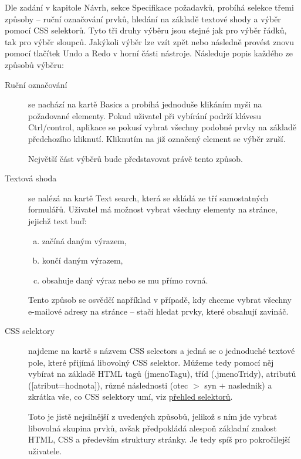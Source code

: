 \documentclass[thesis=B,czech]{FITthesis2}[2012/06/26]
\begin{document}
	Dle zadání v kapitole Návrh, sekce Specifikace požadavků, probíhá selekce třemi způsoby -- ruční označování prvků, hledání na základě textové shody a výběr pomocí CSS selektorů. Tyto tři druhy výběru jsou stejné jak pro výběr řádků, tak pro výběr sloupců. Jakýkoli výběr lze vzít zpět nebo následně provést znovu pomocí tlačítek \textsf{Undo} a \textsf{Redo} v horní části nástroje. Následuje popis každého ze způsobů výběru:
	\begin{description}
		\item[Ruční označování] se nachází na kartě \textsf{Basics} a probíhá jednoduše klikáním myši na požadované elementy. Pokud uživatel při vybírání podrží klávesu \textsf{Ctrl/control}, aplikace se pokusí vybrat všechny podobné prvky na základě předchozího kliknutí. Kliknutím na již označený element se výběr zruší.
		
		Největší část výběrů bude představovat právě tento způsob.
		\item [Textová shoda] se nalézá na kartě \textsf{Text search}, která se skládá ze tří samostatných formulářů. Uživatel má možnost vybrat všechny elementy na stránce, jejichž text buď:
		\begin{enumerate}[a)]
			\item začíná daným výrazem,
			\item končí daným výrazem,
			\item obsahuje daný výraz nebo se mu přímo rovná.
		\end{enumerate}
		Tento způsob se osvědčí například v případě, kdy chceme vybrat všechny e-mailové adresy na stránce -- stačí hledat prvky, které obsahují zavináč.
		\item [CSS selektory] najdeme na kartě s názvem \textsf{CSS selectors} a jedná se o jednoduché textové pole, které přijímá libovolný CSS selektor. Můžeme tedy pomocí něj vybírat na základě HTML tagů (\textsf{jmenoTagu}), tříd (\textsf{.jmenoTridy}), atributů (\textsf{[atribut=hodnota]}), různé následnosti (\textsf{otec $>$ syn $+$ naslednik}) a zkrátka vše, co CSS selektory umí, viz \href{https://www.w3schools.com/cssref/css_selectors.asp}{přehled selektorů}.
		
		Toto je jistě nejsilnější z uvedených způsobů, jelikož s ním jde vybrat libovolná skupina prvků, avšak předpokládá alespoň základní znalost HTML, CSS a především struktury stránky. Je tedy spíš pro pokročilejší uživatele.
	\end{description}
\end{document}

